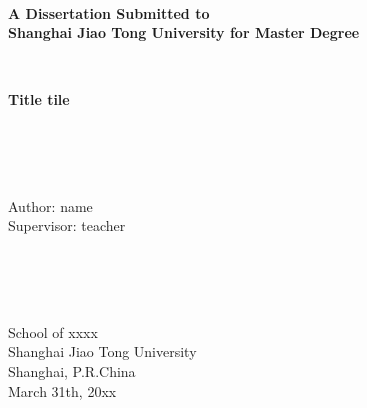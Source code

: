 \newpage
\thispagestyle{empty}
~\\
\begin{center}
\textbf{
A Dissertation Submitted to \\
Shanghai Jiao Tong University for Master Degree}
\end{center}
~\\
\begin{center}
\textbf{Title tile
}
\end{center}
~\\
~\\
~\\
\begin{center}
Author: name\\
Supervisor:  teacher
\end{center}
~\\
~\\
~\\
\begin{center}
School of xxxx\\
Shanghai Jiao Tong University \\
Shanghai, P.R.China \\
March 31th, 20xx  
\end{center}